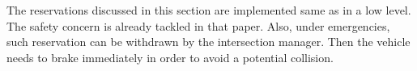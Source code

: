 The reservations discussed in this section are implemented same as
\cite{bib:Dresner08Multiagent} in a low level. The safety concern
is already tackled in that paper. Also, under emergencies, such
reservation can be withdrawn by the intersection manager. Then the
vehicle needs to brake immediately in order to avoid a potential
collision.












